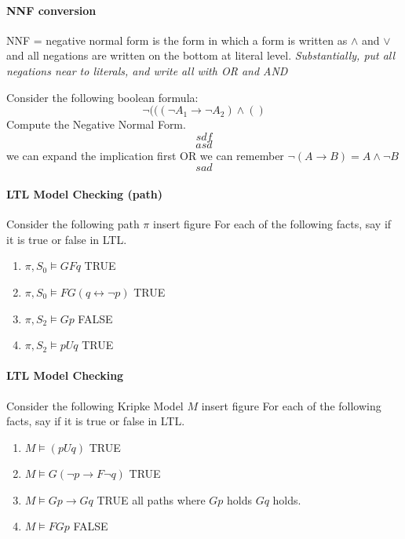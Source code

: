 \documentclass[11pt]{article}
\begin{document}
\paragraph{NNF conversion} %
\label{par:nnf_conversion}
NNF = negative normal form is the form in which a form is written as $\land$ and $\lor$ and all negations are written on the bottom at literal level. \textit{Substantially, put all negations near to literals, and write all with OR and AND}

Consider the following boolean formula:
\[
	\lnot(((\lnot A_1 \rightarrow \lnot A_2) \land ()
\]
Compute the Negative Normal Form.
\[
sdf
\]\[
asd
\]
we can expand the implication first OR we can remember 
$\lnot (A \rightarrow B) = A \land \lnot B$
\[
	sad
\]


\paragraph{LTL Model Checking (path)} %
\label{par:ltl_model_checking}
Consider the following path $\pi$
insert figure
For each of the following facts, say if it is true or false in LTL.
\begin{enumerate}
	\item $\pi, S_0 \models GFq$ TRUE
	\item $\pi, S_0 \models FG(q \leftrightarrow \lnot p)$ TRUE
	\item $\pi, S_2 \models Gp$ FALSE
	\item $\pi, S_2 \models pUq$ TRUE 
\end{enumerate}

\paragraph{LTL Model Checking} %
\label{par:ltl_model_checking}
Consider the following Kripke Model $M$
insert figure
For each of the following facts, say if it is true or false in LTL.
\begin{enumerate}
	\item $M \models (pUq)$ TRUE
	\item $M \models G(\lnot p \rightarrow F\lnot q)$ TRUE
	\item $M \models Gp \rightarrow Gq$ TRUE all paths where $Gp$ holds $Gq$  holds.
	\item $M \models FGp$ FALSE
\end{enumerate}
\end{document}
